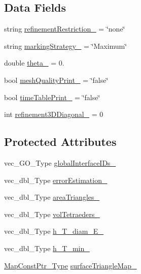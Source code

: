\subsection*{Data Fields}
\begin{DoxyCompactItemize}
\item 
string \hyperlink{classFEDD_1_1RefinementFactory_a2dda98963313023311f044d248befd40}{refinement\+Restriction\+\_\+} = \char`\"{}none\char`\"{}
\item 
string \hyperlink{classFEDD_1_1RefinementFactory_aa499fe1f4daaed1c19fd1744d73c3706}{marking\+Strategy\+\_\+} = \char`\"{}Maximum\char`\"{}
\item 
double \hyperlink{classFEDD_1_1RefinementFactory_aac84121e72b1c2c6ff1691dc91acc9b1}{theta\+\_\+} = 0.
\item 
bool \hyperlink{classFEDD_1_1RefinementFactory_a74d0dd46b30f83f868cd749d28375a42}{mesh\+Quality\+Print\+\_\+} = \char`\"{}false\char`\"{}
\item 
bool \hyperlink{classFEDD_1_1RefinementFactory_ad7ff86aebffde685089d462f2d04203e}{time\+Table\+Print\+\_\+} = \char`\"{}false\char`\"{}
\item 
int \hyperlink{classFEDD_1_1RefinementFactory_a7466053f06c1d52d6fb2c58db06b7a71}{refinement3\+D\+Diagonal\+\_\+} = 0
\end{DoxyCompactItemize}
\subsection*{Protected Attributes}
\begin{DoxyCompactItemize}
\item 
vec\+\_\+\+G\+O\+\_\+\+Type \hyperlink{classFEDD_1_1RefinementFactory_ae71ae7a6d0586a37cdc2aadfafeb00c4}{global\+Interface\+I\+Ds\+\_\+}
\item 
vec\+\_\+dbl\+\_\+\+Type \hyperlink{classFEDD_1_1RefinementFactory_ae04f877455828ca9d2328b6b29a72652}{error\+Estimation\+\_\+}
\item 
vec\+\_\+dbl\+\_\+\+Type \hyperlink{classFEDD_1_1RefinementFactory_ac8f78b4bd97729d0ca0a3a36097da107}{area\+Triangles\+\_\+}
\item 
vec\+\_\+dbl\+\_\+\+Type \hyperlink{classFEDD_1_1RefinementFactory_a7043a525164368b18359a399dede06c3}{vol\+Tetraeders\+\_\+}
\item 
vec\+\_\+dbl\+\_\+\+Type \hyperlink{classFEDD_1_1RefinementFactory_ad1c44661ff740905f2b3634ea285e1a7}{h\+\_\+\+T\+\_\+diam\+\_\+\+E\+\_\+}
\item 
vec\+\_\+dbl\+\_\+\+Type \hyperlink{classFEDD_1_1RefinementFactory_add2c3dc6ee30afaf225baed853475e06}{h\+\_\+\+T\+\_\+min\+\_\+}
\item 
\hyperlink{classFEDD_1_1RefinementFactory_a8256ccdf1b2a5c977ddc011f4e8eb8d3}{Map\+Const\+Ptr\+\_\+\+Type} \hyperlink{classFEDD_1_1RefinementFactory_ae21de28f0848c556b0c90cf6f912de25}{surface\+Triangle\+Map\+\_\+}
\end{DoxyCompactItemize}


